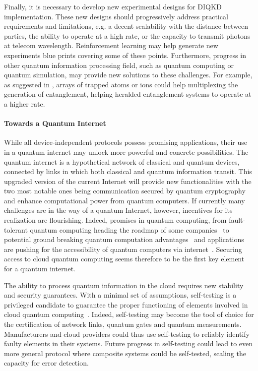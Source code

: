 \medbreak 

Finally, it is necessary to develop new experimental designs for DIQKD implementation.
These new designs should progressively address practical requirements and limitations, e.g. a decent scalability with the distance between parties, the ability to operate at a high rate, or the capacity to transmit photons at telecom wavelength.
Reinforcement learning may help generate new experiments blue prints covering some of these points.
Furthermore, progress in other quantum information processing field, such as quantum computing or quantum simulation, may provide new solutions to these challenges.
For example, as suggested in \cite{Zapatero2023}, arrays of trapped atoms or ions could help multiplexing the generation of entanglement, helping heralded entanglement systems to operate at a higher rate.

\paragraph{Towards a Quantum Internet}

While all device-independent protocols possess promising applications, their use in a quantum internet may unlock more powerful and concrete possibilities.
The quantum internet is a hypothetical network of classical and quantum devices, connected by links in which both classical and quantum information transit.
This upgraded version of the current Internet will provide new functionalities with the two most notable ones being communication secured by quantum cryptography and enhance computational power from quantum computers.
If currently many challenges are in the way of a quantum Internet, however, incentives for its realization are flourishing.
Indeed, promises in quantum computing, from fault-tolerant quantum computing heading the roadmap of some companies~\cite{Google2022,Intel2022,IBM2022} to potential ground breaking quantum computation advantages~\cite{Deutsch1992,Shor1994,Grover1996} and applications~\cite{Bauer2020,Paudel2022} are pushing for the accessibility of quantum computers via internet~\cite{Rietsche2022}.
Securing access to cloud quantum computing seems therefore to be the first key element for a quantum internet.

\medbreak

The ability to process quantum information in the cloud requires new stability and security guarantees.
With a minimal set of assumptions, self-testing is a privileged candidate to guarantee the proper functioning of elements involved in cloud quantum computing~\cite{Sekatski2018}.
Indeed, self-testing may become the tool of choice for the certification of network links, quantum gates and quantum measurements.
Manufacturers and cloud providers could thus use self-testing to reliably identify faulty elements in their systems.
Future progress in self-testing could lead to even more general protocol where composite systems could be self-tested, scaling the capacity for error detection.

